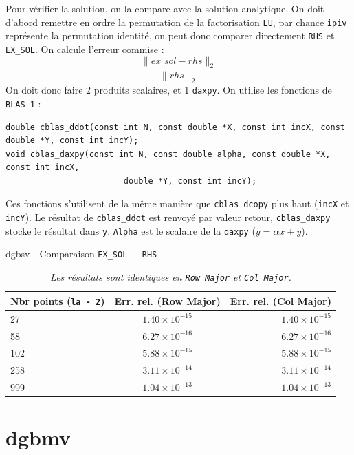 \documentclass{article}
\begin{document}
Pour vérifier la solution, on la compare avec la solution analytique. On doit d'abord remettre en ordre la permutation de la factorisation \texttt{LU}, par chance \texttt{ipiv} représente la permutation identité, on peut donc comparer directement \texttt{RHS} et \texttt{EX\_SOL}. On calcule l'erreur commise :
\[
	\frac{\lVert ex\_sol - rhs \rVert_2}{\lVert rhs \rVert_2}
\]
On doit donc faire 2 produits scalaires, et 1 \texttt{daxpy}. On utilise les fonctions de \texttt{BLAS 1} :
\begin{scriptsize}
\begin{verbatim}
double cblas_ddot(const int N, const double *X, const int incX, const double *Y, const int incY);
void cblas_daxpy(const int N, const double alpha, const double *X, const int incX, 
						double *Y, const int incY);
\end{verbatim}
\end{scriptsize}
Ces fonctions s'utilisent de la même manière que \texttt{cblas\_dcopy} plus haut (\texttt{incX} et \texttt{incY}). Le résultat de \texttt{cblas\_ddot} est renvoyé par valeur retour, \texttt{cblas\_daxpy} stocke le résultat dans \texttt{y}.
\texttt{Alpha} est le scalaire de la \texttt{daxpy} (\(y = \alpha x + y\)).

\begin{table}[H]
\caption{dgbsv - Comparaison \texttt{EX\_SOL - RHS}}
\centering
\renewcommand*\arraystretch{1.1}
\begin{tabular}{|l|c|r|}
  \hline
  Nbr points (\texttt{la - 2}) & Err. rel. (Row Major) & Err. rel. (Col Major) \\
  \hline
	27	&	\(1.40 \times 10^{-15}\)	&	\(1.40 \times 10^{-15}\)	\\
	58	&	\(6.27 \times 10^{-16}\)	&	\(6.27 \times 10^{-16}\)	\\
	102	&	\(5.88 \times 10^{-15}\)	&	\(5.88 \times 10^{-15}\)	\\
	258	&	\(3.11 \times 10^{-14}\)	&	\(3.11 \times 10^{-14}\)	\\
	999	&	\(1.04 \times 10^{-13}\)	&	\(1.04 \times 10^{-13}\)	\\
  \hline
\end{tabular}
\caption*{\textit{Les résultats sont identiques en \texttt{Row Major} et \texttt{Col Major}.}}
\end{table}

\section{dgbmv}
\end{document}
